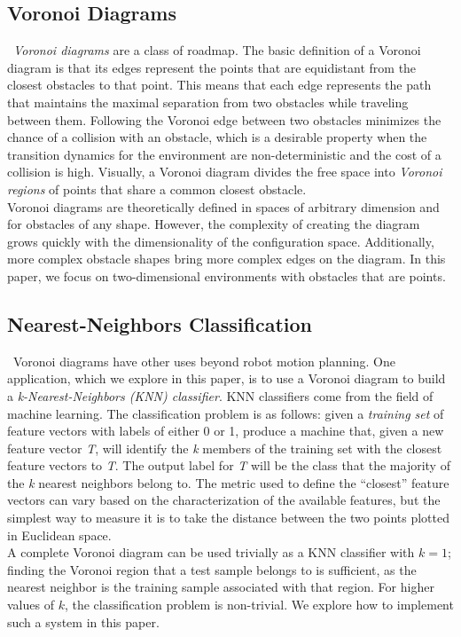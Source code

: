 \documentclass[conference]{IEEEtran}
\begin{document}
\subsection{Voronoi Diagrams}
\noindent\ \emph{Voronoi diagrams} are a class of roadmap. The basic definition
of a Voronoi diagram is that its edges represent the points that are
equidistant from the closest obstacles to that point. This means that each
edge represents the path that maintains the maximal separation from two
obstacles while traveling between them. Following the Voronoi edge between two
obstacles minimizes the chance of a collision with an obstacle, which is
a desirable property when the transition dynamics for the environment are
non-deterministic and the cost of a collision is high. Visually, a Voronoi diagram divides
the free space into \emph{Voronoi regions} of points that share a common closest obstacle.\\
\indent Voronoi diagrams are theoretically defined in spaces of arbitrary dimension
and for obstacles of any shape. However, the complexity of creating the
diagram grows quickly with the dimensionality of the configuration space.
Additionally, more complex obstacle shapes bring more complex edges on the diagram.
In this paper, we focus on two-dimensional environments with obstacles that
are points.

\subsection{Nearest-Neighbors Classification}
\noindent\ Voronoi diagrams have other uses beyond robot motion planning.
One application, which we explore in this paper, is to use a Voronoi diagram
to build a \emph{k-Nearest-Neighbors (KNN) classifier}. KNN classifiers come from
the field of machine learning. The classification problem is as follows:
given a \emph{training set} of feature vectors with labels of either 0 or 1,
produce a machine that, given a new feature vector \emph{T}, will identify the \emph{k}
members of the training set with the closest feature vectors to \emph{T}. The
output label for \emph{T} will be the class that the majority of the \emph{k} nearest
neighbors belong to. The metric used to define the ``closest'' feature
vectors can vary based on the characterization of the available features,
but the simplest way to measure it is to take the distance between the
two points plotted in Euclidean space.\\
\indent A complete Voronoi diagram can be used trivially as a KNN classifier with
$k=1$; finding the Voronoi region that a test sample belongs to is sufficient,
as the nearest neighbor is the training sample associated with that region. For
higher values of $k$, the classification problem is non-trivial. We explore how
to implement such a system in this paper.
\end{document}
